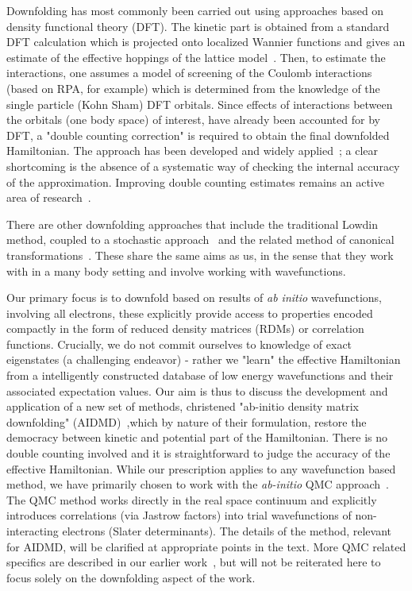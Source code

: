 \documentclass[prl,12pt,onecolumn,nofootinbib,notitlepage,english,superscriptaddress]{revtex4-1}
\begin{document}
Downfolding has most commonly been carried out using approaches based on density functional theory (DFT). 
The kinetic part is obtained from a standard 
DFT calculation which is projected onto localized Wannier functions and 
gives an estimate of the effective hoppings of the lattice model~\cite{Pavirini}. 
Then, to estimate the interactions, one assumes a model of screening of the Coulomb interactions 
(based on RPA, for example) which is determined from the knowledge of the single particle (Kohn Sham) 
DFT orbitals. Since effects of interactions between the orbitals (one body space) of interest, have already 
been accounted for by DFT, a "double counting correction" is required to obtain the final 
downfolded Hamiltonian. The approach has been developed and widely applied~\cite{}; 
a clear shortcoming is the absence of a systematic way of checking 
the internal accuracy of the approximation. Improving double counting estimates remains an active area of 
research~\cite{Haule_doublecounting}.

There are other downfolding approaches that include the traditional Lowdin method, coupled to a stochastic 
approach~\cite{Tenno,Zhou_Ceperley} and the related method of canonical transformations~\cite{White_CT, Yanai_CT}. 
These share the same aims as us, in the sense that they work with 
in a many body setting and involve working with wavefunctions. 

Our primary focus is to downfold based on results of \emph{ab initio} wavefunctions, involving all electrons, 
these explicitly provide access to properties encoded compactly in the form of reduced 
density matrices (RDMs) or correlation functions. Crucially, we do not commit ourselves to 
knowledge of exact eigenstates (a challenging endeavor) - rather we "learn" the effective Hamiltonian from a 
intelligently constructed database of low energy wavefunctions and their associated expectation values. 
Our aim is thus to discuss the development and application of a new set of methods, christened 
"ab-initio density matrix downfolding" (AIDMD)~\cite{Changlani2015},which by nature of their formulation, 
restore the democracy between kinetic and potential part of the Hamiltonian. There is no double counting involved and it is straightforward 
to judge the accuracy of the effective Hamiltonian. While our prescription applies to any wavefunction based method, 
we have primarily chosen to work with the \emph{ab-initio} QMC approach~\cite{Ceperley_Alder,Foulkes_review}. 
The QMC method works directly in the real space continuum and explicitly introduces correlations (via Jastrow factors) 
into trial wavefunctions of non-interacting electrons (Slater determinants). 
The details of the method, relevant for AIDMD, will be clarified at appropriate points 
in the text. More QMC related specifics are described in our earlier work~\cite{Changlani2015,}, but will not be 
reiterated here to focus solely on the downfolding aspect of the work. 
\end{document}
